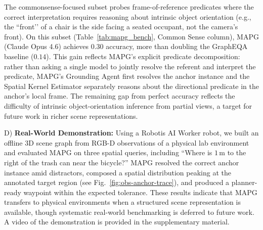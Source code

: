 The commonsense-focused subset probes frame-of-reference predicates where the correct interpretation requires reasoning about intrinsic object orientation (e.g., the ``front’’ of a chair is the side facing a seated occupant, not the camera’s front). On this subset (Table~\ref{tab:mapg_bench}, Common Sense column), MAPG (Claude Opus 4.6) achieves $0.30$ accuracy, more than doubling the GraphEQA baseline ($0.14$). This gain reflects MAPG’s explicit predicate decomposition: rather than asking a single model to jointly resolve the referent and interpret the predicate, MAPG’s Grounding Agent first resolves the anchor instance and the Spatial Kernel Estimator separately reasons about the directional predicate in the anchor’s local frame. The remaining gap from perfect accuracy reflects the difficulty of intrinsic object-orientation inference from partial views, a target for future work in richer scene representations. 

\noindent D) \textbf{Real-World Demonstration:} %
Using a Robotis AI Worker robot, we built an offline $3$D scene graph from RGB-D observations of a physical lab environment and evaluated MAPG on three spatial queries, including ``Where is $1\,\mathrm{m}$ to the right of the trash can near the bicycle?'' MAPG resolved the correct anchor instance amid distractors, composed a spatial distribution peaking at the annotated target region (see Fig.~\ref{fig:obs-anchor-trace}), and produced a planner-ready waypoint within the expected tolerance. These results indicate that MAPG transfers to physical environments when a structured scene representation is available, though systematic real-world benchmarking is deferred to future work. A video of the demonstration is provided in the supplementary material.


